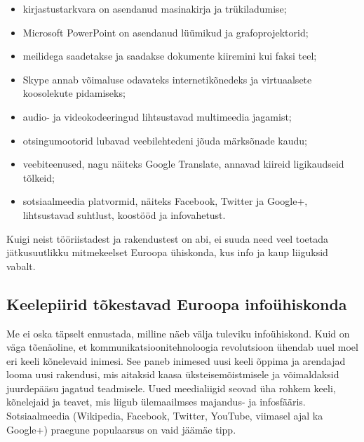 \documentclass[]{../metanetpaper}
\begin{document}
\begin{multicols}{2}
\begin{itemize}
\item kirjastustarkvara on asendanud masi\-na\-kirja ja trükiladumise;
      \item Microsoft PowerPoint on asendanud lüümikud ja grafoprojektorid;
      \item meilidega saadetakse ja saadakse dokumente kiiremini kui faksi teel;
      \item Skype annab võimaluse odavateks internetikõnedeks ja virtuaalsete koosolekute pidamiseks;
      \item audio- ja videokodeeringud lihtsustavad multimeedia jagamist;
      \item otsingumootorid lubavad veebilehtedeni jõuda märksõnade kaudu;
      \item veebiteenused, nagu näiteks Google Translate, annavad kiireid ligikaudseid tõlkeid;
      \item sotsiaalmeedia platvormid, näiteks Facebook, Twitter ja Google+, lihtsustavad suhtlust, koostööd ja infovahetust.
\end{itemize}

Kuigi neist tööriistadest ja rakendustest on abi, ei suuda need veel toetada jätku\-suutlikku mitmekeelset Euroopa ühiskonda, kus info ja kaup liiguksid vabalt.

\subsection{Keelepiirid tõkestavad Euroopa infoühiskonda}
  
Me ei oska täpselt ennustada, milline näeb välja tuleviku infoühiskond. 
Kuid on väga tõenäoline, et kommunikatsioonitehno\-loogia revolutsioon ühendab uuel moel eri keeli kõnelevaid inimesi. 
See paneb ini\-mesed uusi keeli õppima ja arendajad looma uusi rakendusi, mis aitaksid kaasa üks\-teisemõistmisele ja võimaldaksid juurdepääsu jagatud teadmisele. 
Uued meedia\-liigid seovad üha rohkem keeli, kõnelejaid ja teavet, mis liigub ülemaailmses majandus- ja infosfääris. 
Sotsiaalmeedia (Wikipedia, Facebook, Twitter, YouTube, viimasel ajal ka Google+) praegune popu\-laarsus on vaid jäämäe tipp.




\end{multicols}
\end{document}
